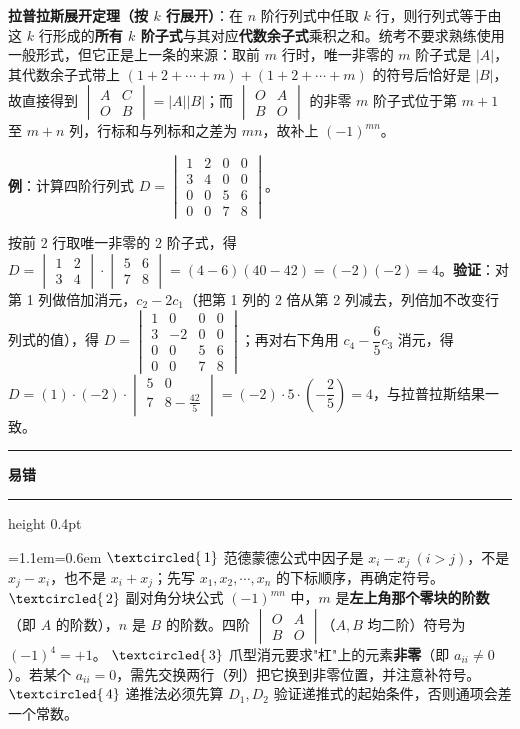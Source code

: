\documentclass[11pt,openany,UTF8]{ctexbook}
\newcommand{\circled}[1]{\textcircled{\scriptsize\,#1}}
\newcommand{\callouthead}[2]{%
  \par\addvspace{7pt}\noindent
  {\color{#1}\rule[-0.15em]{3pt}{1.05em}}\hspace{0.5em}%
  {\bfseries\color{#1}#2}\par\nobreak\vspace{-0.35em}%
  {\color{rulesep}\hrule height 0.4pt}\nobreak\vspace{0.45em}%
  \begingroup\small\setlength{\parindent}{0pt}%
  \leftskip=1.1em\rightskip=0.6em\noindent\ignorespaces}
\newcommand{\calloutend}{\par\endgroup\addvspace{7pt}}
\newenvironment{callwarn}[1]{\callouthead{warnbar}{#1}}{\calloutend}
\begin{document}
\textbf{拉普拉斯展开定理（按 $k$ 行展开）}：在 $n$ 阶行列式中任取 $k$ 行，则行列式等于由这 $k$ 行形成的\textbf{所有 $k$ 阶子式}与其对应\textbf{代数余子式}乘积之和。统考不要求熟练使用一般形式，但它正是上一条的来源：取前 $m$ 行时，唯一非零的 $m$ 阶子式是 $\vert A\vert$，其代数余子式带上 $(1+2+\cdots+m)+(1+2+\cdots+m)$ 的符号后恰好是 $\vert B\vert$，故直接得到 $\begin{vmatrix}A&C\\O&B\end{vmatrix}=\vert A\vert\vert B\vert$；而 $\begin{vmatrix}O&A\\B&O\end{vmatrix}$ 的非零 $m$ 阶子式位于第 $m+1$ 至 $m+n$ 列，行标和与列标和之差为 $mn$，故补上 $(-1)^{mn}$。

\textbf{例}：计算四阶行列式 $D=\begin{vmatrix}1&2&0&0\\3&4&0&0\\0&0&5&6\\0&0&7&8\end{vmatrix}$。

按前 $2$ 行取唯一非零的 $2$ 阶子式，得 $D=\begin{vmatrix}1&2\\3&4\end{vmatrix}\cdot\begin{vmatrix}5&6\\7&8\end{vmatrix}=(4-6)(40-42)=(-2)(-2)=4$。\textbf{验证}：对第 1 列做倍加消元，$c_2-2c_1$（把第 1 列的 $2$ 倍从第 2 列减去，列倍加不改变行列式的值），得 $D=\begin{vmatrix}1&0&0&0\\3&-2&0&0\\0&0&5&6\\0&0&7&8\end{vmatrix}$；再对右下角用 $c_4-\dfrac{6}{5}c_3$ 消元，得 $D=(1)\cdot(-2)\cdot\begin{vmatrix}5&0\\7&8-\frac{42}{5}\end{vmatrix}=(-2)\cdot5\cdot\left(-\dfrac25\right)=4$，与拉普拉斯结果一致。

\begin{callwarn}{易错}
$\circled{1}$ 范德蒙德公式中因子是 $x_i-x_j\ (i>j)$，不是 $x_j-x_i$，也不是 $x_i+x_j$；先写 $x_1,x_2,\cdots,x_n$ 的下标顺序，再确定符号。 $\circled{2}$ 副对角分块公式 $(-1)^{mn}$ 中，$m$ 是\textbf{左上角那个零块的阶数}（即 $A$ 的阶数），$n$ 是 $B$ 的阶数。四阶 $\begin{vmatrix}O&A\\B&O\end{vmatrix}$（$A,B$ 均二阶）符号为 $(-1)^{4}=+1$。 $\circled{3}$ 爪型消元要求"杠"上的元素\textbf{非零}（即 $a_{ii}\ne0$）。若某个 $a_{ii}=0$，需先交换两行（列）把它换到非零位置，并注意补符号。 $\circled{4}$ 递推法必须先算 $D_1,D_2$ 验证递推式的起始条件，否则通项会差一个常数。

\end{callwarn}
\end{document}
